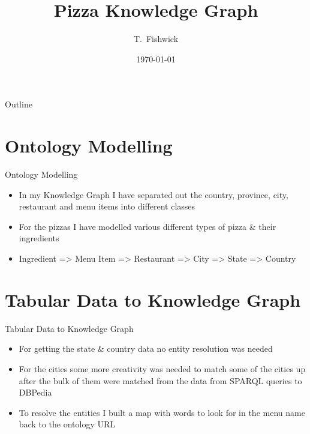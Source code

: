 \documentclass{beamer}
\title{Pizza Knowledge Graph}
\author[Thomas Fishwick] %
{T.~Fishwick\inst{1}}
\institute[Universities of Somewhere and Elsewhere] %
{
  \inst{1}%
  City University}
\date[Short Occasion] %
{\today}
\begin{document}
\begin{frame}
  \titlepage
\end{frame}

\begin{frame}{Outline}
  \tableofcontents
\end{frame}




\section{Ontology Modelling}

\begin{frame}{Ontology Modelling}
	\begin{itemize}
		\item In my Knowledge Graph I have separated out the country, province, city, restaurant and menu items into different classes
		\item For the pizzas I have modelled various different types of pizza \& their ingredients
		\item Ingredient => Menu Item => Restaurant => City => State => Country
	\end{itemize}

\end{frame}

\section{Tabular Data to Knowledge Graph}
\begin{frame}{Tabular Data to Knowledge Graph}
	\begin{itemize}
		\item For getting the state \& country data no entity resolution was needed
		\item For the cities some more creativity was needed to match some of the cities up after the bulk of them were matched from the data from SPARQL queries to DBPedia
		\item To resolve the entities I built a map with words to look for in the menu name back to the ontology URL
	\end{itemize}
\end{frame}
\end{document}

